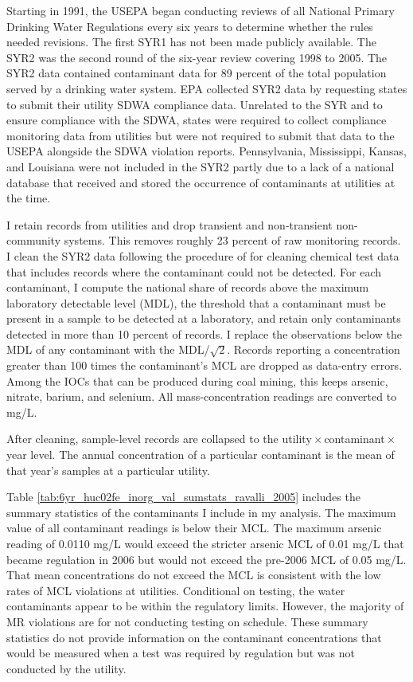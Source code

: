 \documentclass{article}
\begin{document}
Starting in 1991, the USEPA began conducting reviews of all National Primary Drinking Water Regulations every six years to determine whether the rules needed revisions. The first SYR1 has not been made publicly available. The SYR2 was the second round of the six-year review covering 1998 to 2005. The SYR2 data contained contaminant data for 89 percent of the total population served by a drinking water system. EPA collected SYR2 data by requesting states to submit their utility SDWA compliance data. Unrelated to the SYR and to ensure compliance with the SDWA, states were required to collect compliance monitoring data from utilities but were not required to submit that data to the USEPA alongside the SDWA violation reports. Pennsylvania, Mississippi, Kansas, and Louisiana were not included in the SYR2 partly due to a lack of a national database that received and stored the occurrence of contaminants at utilities at the time.

I retain records from utilities and drop transient and non-transient non-community systems. This removes roughly 23 percent of raw monitoring records. I clean the SYR2 data following the procedure of \textcite{ravalli2022sociodemographic} for cleaning chemical test data that includes records where the contaminant could not be detected. For each contaminant, I compute the national share of records above the maximum laboratory detectable level (MDL), the threshold that a contaminant must be present in a sample to be detected at a laboratory, and retain only contaminants detected in more than 10 percent of records. I replace the observations below the MDL of any contaminant with the MDL/$\sqrt{2}$. Records reporting a concentration greater than 100 times the contaminant's MCL are dropped as data-entry errors. Among the IOCs that can be produced during coal mining, this keeps arsenic, nitrate, barium, and selenium. All mass-concentration readings are converted to mg/L.

After cleaning, sample-level records are collapsed to the utility\,$\times$\,contaminant\,$\times$\,year level. The annual concentration of a particular contaminant is the mean of that year's samples at a particular utility.

Table \ref{tab:6yr_huc02fe_inorg_val_sumstats_ravalli_2005} includes the summary statistics of the contaminants I include in my analysis. The maximum value of all contaminant readings is below their MCL. The maximum arsenic reading of 0.0110 mg/L would exceed the stricter arsenic MCL of 0.01 mg/L that became regulation in 2006 but would not exceed the pre-2006 MCL of 0.05 mg/L. That mean concentrations do not exceed the MCL is consistent with the low rates of MCL violations at utilities. Conditional on testing, the water contaminants appear to be within the regulatory limits. However, the majority of MR violations are for not conducting testing on schedule. These summary statistics do not provide information on the contaminant concentrations that would be measured when a test was required by regulation but was not conducted by the utility.
\end{document}
